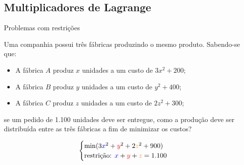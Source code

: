 %
%
%
%




\subsection*{Multiplicadores de Lagrange}


\begin{frame}[label=otimizacao]{Problemas com restrições}

\begin{block}{ }
Uma companhia possui três fábricas produzindo o mesmo produto. Sabendo-se que:
\begin{itemize}
\item A fábrica {\color{blue} \(A\)} produz {\color{blue} \(x\)} unidades a um custo de \(3x^2+200\);
\item A fábrica {\color{red} \(B\)} produz {\color{red} \(y\)} unidades a um custo de \(y^2+400\);
\item A fábrica {\color{orange} \(C\)} produz {\color{orange} \(z\)} unidades a um custo de \(2z^2+300\);
\end{itemize}
se um pedido de 1.100 unidades deve ser entregue, como a produção deve ser distribuída entre as três fábricas a fim de minimizar os custos?
\end{block}

\[
\begin{cases}
\min (3{\color{blue}x}^2+{\color{red}y}^2+2{\color{orange}z}^2+900)\\
\text{restrição: } {\color{blue}x}+{\color{red}y}+{\color{orange}z}=1.100
\end{cases}
\]


\end{frame}


